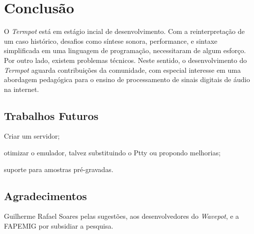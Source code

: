 \section{Conclusão}\label{sec:conclusao}

O \emph{Termpot} está em estágio incial de desenvolvimento. Com a reinterpretação de um caso histórico, desafios como síntese sonora, performance, e sintaxe simplificada em uma linguagem de programação, necessitaram de algum esforço. Por outro lado, existem problemas técnicos. Neste sentido, o desenvolvimento do \emph{Termpot} aguarda contribuições da comunidade, com especial interesse em uma abordagem pedagógica para o ensino de processamento de sinais digitais de áudio na internet.

\subsection{Trabalhos Futuros}

\begin{inparaenum}
\item Criar um servidor;
\item otimizar o emulador, talvez substituindo o Ptty ou propondo melhorias;
\item suporte para amostras pré-gravadas.
\end{inparaenum}
\subsection{Agradecimentos}

Guilherme Rafael Soares pelas sugestões, aos desenvolvedores do \emph{Wavepot}, e a FAPEMIG por subsidiar a pesquisa.
